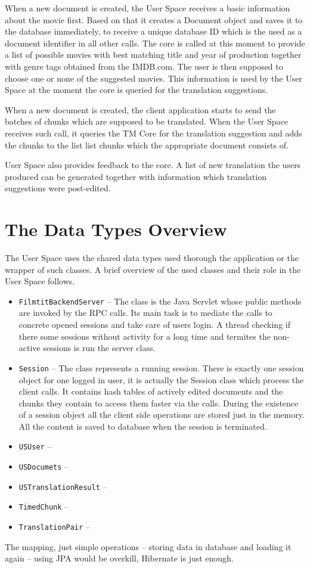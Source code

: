When a new document is created, the User Space receives a basic information about the movie first. Based on that it creates a Document object and saves it to the database immediately, to receive a unique  database ID which is the used as a document identifier in all other calls. The core is called at this moment to provide a list of possible movies with best matching title and year of production together with genre tags obtained from the IMDB.com. The user is then supposed to choose one or none of the suggested movies. This information is used by the User Space at the moment the core is queried for the translation suggestions.

When a new document is created, the client application starts to send the batches of chunks which are supposed to be translated. When the User Space receives such call, it queries the TM Core for the translation suggestion and adds the chunks to the list list chunks which the appropriate document consists of.

User Space also provides feedback to the core. A list of new translation the users produced can be generated together with information which translation suggestions were post-edited.

\section{The Data Types Overview}

The User Space uses the shared data types used thorough the application or the wrapper of such classes. A brief overview of the used classes and their role in the User Space follows.

\begin{itemize}
\item {\tt FilmtitBackendServer}  -- The class is the Java Servlet whose public methods are invoked by the RPC calls. Its main task is to mediate the calls to concrete opened sessions and take care of users login. A thread checking if there some sessions without activity for a long time and termites the non-active sessions is run the server class.

\item {\tt Session} -- The class represents a running session. There is exactly one session object for one logged in user, it is actually the Session class which process the client calls. It contains hash tables of actively edited documents and the chunks they contain to access them faster via the calls. During the existence of a session object all the client side operations are stored just in the memory. All the content is saved to database when the session is terminated.

\item {\tt USUser} --

\item {\tt USDocumets} --

\item {\tt USTranslationResult} --

\item {\tt TimedChunk} --

\item {\tt TranslationPair} --
\end{itemize}

The mapping, just simple operations -- storing data in database and loading it again -- using JPA would be overkill, Hibernate is just enough.
